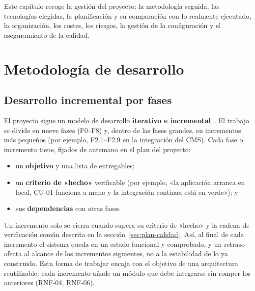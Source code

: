 \label{cap:plan}

Este capítulo recoge la gestión del proyecto: la metodología seguida, las
tecnologías elegidas, la planificación y su comparación con lo realmente
ejecutado, la organización, los costes, los riesgos, la gestión de la
configuración y el aseguramiento de la calidad.

\section{Metodología de desarrollo}
\label{sec:plan-metodologia}

\subsection{Desarrollo incremental por fases}
\label{sec:plan-incremental}

El proyecto sigue un modelo de desarrollo \textbf{iterativo e
incremental}~\cite{larman2003iterative}. El trabajo se divide en nueve fases
(F0--F8) y, dentro de las fases grandes, en incrementos más pequeños (por
ejemplo, F2.1--F2.9 en la integración del CMS). Cada fase o incremento tiene,
fijados de antemano en el plan del proyecto:

\begin{itemize}
  \item un \textbf{objetivo} y una lista de entregables;
  \item un \textbf{criterio de «hecho»} verificable (por ejemplo, «la
        aplicación arranca en local, CU-01 funciona a mano y la integración
        continua está en verde»); y
  \item sus \textbf{dependencias} con otras fases.
\end{itemize}

Un incremento solo se cierra cuando supera su criterio de «hecho» y la cadena
de verificación común descrita en la sección~\ref{sec:plan-calidad}. Así, al
final de cada incremento el sistema queda en un estado funcional y comprobado,
y un retraso afecta al alcance de los incrementos siguientes, no a la
estabilidad de lo ya construido. Esta forma de trabajar encaja con el objetivo
de una arquitectura reutilizable: cada incremento añade un módulo que debe
integrarse sin romper los anteriores (RNF-04, RNF-06).

